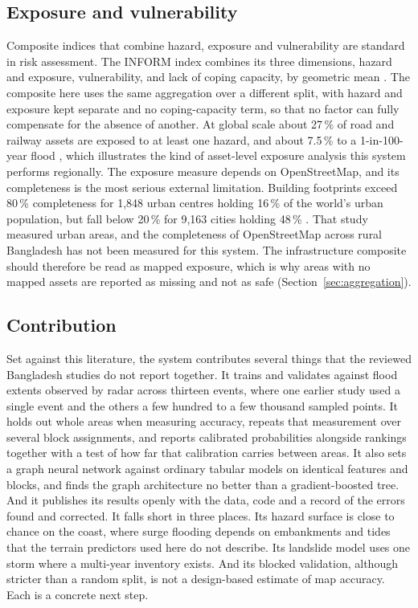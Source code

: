 \documentclass[10pt,a4paper,twocolumn]{article}
\begin{document}
\subsection{Exposure and vulnerability}

Composite indices that combine hazard, exposure and vulnerability are standard in risk assessment. The INFORM index combines its three dimensions, hazard and exposure, vulnerability, and lack of coping capacity, by geometric mean \citep{inform2017}. The composite here uses the same aggregation over a different split, with hazard and exposure kept separate and no coping-capacity term, so that no factor can fully compensate for the absence of another. At global scale about 27\,\% of road and railway assets are exposed to at least one hazard, and about 7.5\,\% to a 1-in-100-year flood \citep{koks2019}, which illustrates the kind of asset-level exposure analysis this system performs regionally. The exposure measure depends on OpenStreetMap, and its completeness is the most serious external limitation. Building footprints exceed 80\,\% completeness for 1,848 urban centres holding 16\,\% of the world's urban population, but fall below 20\,\% for 9,163 cities holding 48\,\% \citep{herfort2023}. That study measured urban areas, and the completeness of OpenStreetMap across rural Bangladesh has not been measured for this system. The infrastructure composite should therefore be read as mapped exposure, which is why areas with no mapped assets are reported as missing and not as safe (Section~\ref{sec:aggregation}).

\subsection{Contribution}

Set against this literature, the system contributes several things that the reviewed Bangladesh studies do not report together. It trains and validates against flood extents observed by radar across thirteen events, where one earlier study used a single event \citep{islamr2024} and the others a few hundred to a few thousand sampled points. It holds out whole areas when measuring accuracy, repeats that measurement over several block assignments, and reports calibrated probabilities alongside rankings together with a test of how far that calibration carries between areas. It also sets a graph neural network against ordinary tabular models on identical features and blocks, and finds the graph architecture no better than a gradient-boosted tree. And it publishes its results openly with the data, code and a record of the errors found and corrected. It falls short in three places. Its hazard surface is close to chance on the coast, where surge flooding depends on embankments and tides that the terrain predictors used here do not describe. Its landslide model uses one storm where a multi-year inventory exists. And its blocked validation, although stricter than a random split, is not a design-based estimate of map accuracy. Each is a concrete next step.
\end{document}
